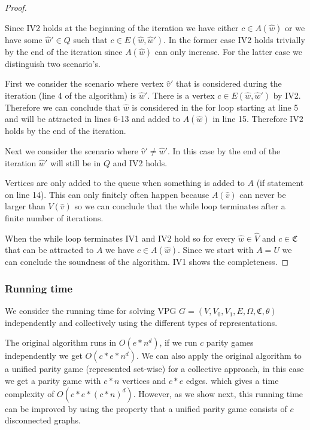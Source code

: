 \begin{theorem}
\begin{proof}
\begin{itemize}
			Since IV2 holds at the beginning of the iteration we have either $c \in A(\hat{w})$ or we have some $\hat{w}' \in Q$ such that $c \in E(\hat{w},\hat{w}')$. In the former case IV2 holds trivially by the end of the iteration since $A(\hat{w})$ can only increase. For the latter case we distinguish two scenario's. 
			
			First we consider the scenario where vertex $\hat{v}'$ that is considered during the iteration (line 4 of the algorithm) is $\hat{w}'$. There is a vertex $c \in E(\hat{w},\hat{w}')$ by IV2. Therefore we can conclude that $\hat{w}$ is considered in the for loop starting at line 5 and will be attracted in lines 6-13 and added to $A(\hat{w})$ in line 15. Therefore IV2 holds by the end of the iteration.
			
			Next we consider the scenario where $\hat{v}' \neq \hat{w}'$. In this case by the end of the iteration $\hat{w}'$ will still be in $Q$ and IV2 holds.
		\end{itemize}
	
	Vertices are only added to the queue when something is added to $A$ (if statement on line 14). This can only finitely often happen because $A(\hat{v})$ can never be larger than $V(\hat{v})$ so we can conclude that the while loop terminates after a finite number of iterations.
	
		When the while loop terminates IV1 and IV2 hold so for every $\hat{w} \in \hat{V}$ and $c \in \mathfrak{C}$ that can be attracted to $A$ we have $c \in A(\hat{w})$. Since we start with $A = U$ we can conclude the soundness of the algorithm. IV1 shows the completeness.
	\end{proof}
\end{theorem}


\subsubsection{Running time}
We consider the running time for solving VPG $G = (V,V_0,V_1,E,\Omega,\mathfrak{C},\theta)$ independently and collectively using the different types of representations.

The original algorithm runs in $O(e * n^d)$, if we run $c$ parity games independently we get $O(c * e * n ^d)$. We can also apply the original algorithm to a unified parity game (represented set-wise) for a collective approach, in this case we get a parity game with $c*n$ vertices and $c*e$ edges. which gives a time complexity of $O(c*e*(c*n)^d)$. However, as we show next, this running time can be improved by using the property that a unified parity game consists of $c$ disconnected graphs.

